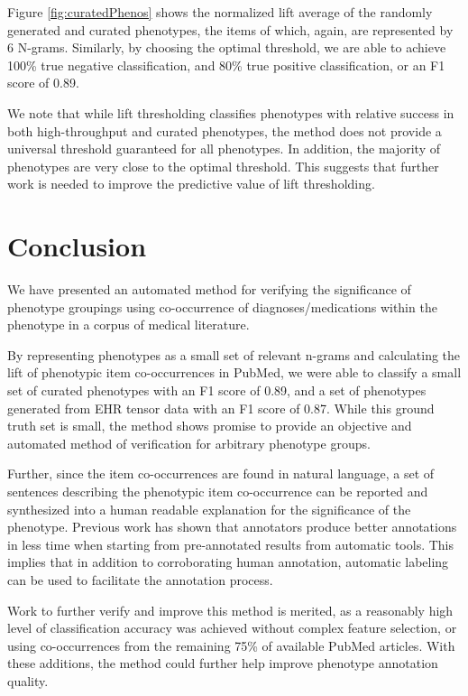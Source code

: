 \documentclass{sig-alternate-05-2015}
\begin{document}
Figure \ref{fig:curatedPhenos} shows the normalized lift average of the randomly generated and curated phenotypes, the items of which, again, are represented by 6 N-grams. Similarly, by choosing the optimal threshold, we are able to achieve 100\% true negative classification, and 80\% true positive classification, or an F1 score of 0.89.

We note that while lift thresholding classifies phenotypes with relative success in both high-throughput and curated phenotypes, the method does not provide a universal threshold guaranteed for all phenotypes. In addition, the majority of phenotypes are very close to the optimal threshold. This suggests that further work is needed to improve the predictive value of lift thresholding.

\section{Conclusion}
We have presented an automated method for verifying the significance of phenotype groupings using co-occurrence of diagnoses/medications within the phenotype in a corpus of medical literature. 

By representing phenotypes as a small set of relevant n-grams and calculating the lift of phenotypic item co-occurrences in PubMed, we were able to classify a small set of curated phenotypes with an F1 score of 0.89, and a set of phenotypes generated from EHR tensor data with an F1 score of 0.87. While this ground truth set is small, the method shows promise to provide an objective and automated method of verification for arbitrary phenotype groups. 

Further, since the item co-occurrences are found in natural language, a set of sentences describing the phenotypic item co-occurrence can be reported and synthesized into a human readable explanation for the significance of the phenotype. Previous work \cite{neveol2011semi} has shown that annotators produce better annotations in less time when starting from pre-annotated results from automatic tools. This implies that in addition to corroborating human annotation, automatic labeling can be used to facilitate the annotation process. 

Work to further verify and improve this method is merited, as a reasonably high level of classification accuracy was achieved without complex feature selection, or using co-occurrences from the remaining 75\% of available PubMed articles. With these additions, the method could further help improve phenotype annotation quality. 



%
%
%


\end{document}

